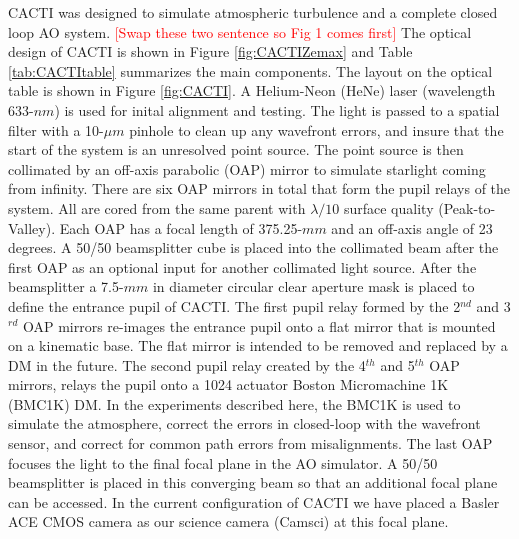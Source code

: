 \documentclass[12pt]{spieman}  %
\newcommand{\jrmcom}[1]{\textcolor{red}{[#1]}}
\begin{document}
\begin{spacing}{2}
CACTI was designed to simulate atmospheric turbulence and a complete closed loop AO system. \jrmcom{Swap these two sentence so Fig 1 comes first} The optical design of  CACTI  is shown in Figure \ref{fig:CACTIZemax} and Table \ref{tab:CACTItable} summarizes the main components. The layout on the optical table is shown in Figure \ref{fig:CACTI}. A Helium-Neon (HeNe) laser (wavelength 633-$nm$) is used for inital alignment and testing.  The light is passed to a spatial filter with a 10-$\mu m$ pinhole to clean up any wavefront errors, and insure that the start of the system is an unresolved point source. The point source is then collimated by an off-axis parabolic (OAP) mirror to simulate starlight coming from infinity. There are six OAP mirrors in total that form the pupil relays of the system. All are cored from the same parent with $\lambda /10$ surface quality (Peak-to-Valley). Each OAP has a focal length of 375.25-$mm$ and an off-axis angle of 23 degrees. A 50/50 beamsplitter cube is placed into the collimated beam after the first OAP as an optional input for another collimated light source. After the beamsplitter a 7.5-$mm$ in diameter circular clear aperture mask is placed to define the entrance pupil of CACTI. The first pupil relay formed by the 2$^{nd}$ and 3$^{rd}$ OAP mirrors re-images the entrance pupil onto a flat mirror that is mounted on a kinematic base. The flat mirror is intended to be removed and replaced by a DM in the future. The second pupil relay created by the 4$^{th}$ and 5$^{th}$ OAP mirrors, relays the pupil onto a 1024 actuator Boston Micromachine 1K (BMC1K) DM. In the experiments described here, the BMC1K is used to simulate the atmosphere, correct the errors in closed-loop with the wavefront sensor, and correct for common path errors from misalignments. The last OAP focuses the light to the final focal plane in the AO simulator. A 50/50 beamsplitter is placed in this converging beam so that an additional focal plane can be accessed. In the current configuration of CACTI we have placed a Basler ACE CMOS camera as our science camera (Camsci) at this focal plane.


\end{spacing}
\end{document}
